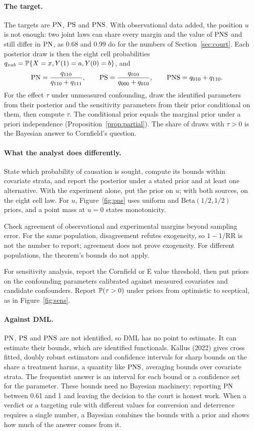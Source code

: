 \paragraph{The target.} The targets are $\mathrm{PN}$, $\mathrm{PS}$ and $\mathrm{PNS}$. With observational data added, the position $u$ is not enough: two joint laws can share every margin and the value of $\mathrm{PNS}$ and still differ in $\mathrm{PN}$, as 0.68 and 0.99 do for the numbers of Section~\ref{sec:court}. Each posterior draw is then the eight cell probabilities $q_{xab} = \mathbb{P}\{X = x, Y(1) = a, Y(0) = b\}$, and
\[
\mathrm{PN} = \frac{q_{110}}{q_{110} + q_{111}}, \qquad \mathrm{PS} = \frac{q_{010}}{q_{000} + q_{010}}, \qquad \mathrm{PNS} = q_{010} + q_{110}.
\]
For the effect $\tau$ under unmeasured confounding, draw the identified parameters from their posterior and the sensitivity parameters from their prior conditional on them, then compute $\tau$. The conditional prior equals the marginal prior under a priori independence (Proposition~\ref{prop:partial}). The share of draws with $\tau > 0$ is the Bayesian answer to Cornfield's question.

\paragraph{What the analyst does differently.} State which probability of causation is sought, compute its bounds within covariate strata, and report the posterior under a stated prior and at least one alternative. With the experiment alone, put the prior on $u$; with both sources, on the eight cell law. For $u$, Figure~\ref{fig:pns} uses uniform and $\mathrm{Beta}(1/2, 1/2)$ priors, and a point mass at $u = 0$ states monotonicity.

Check agreement of observational and experimental margins beyond sampling error. For the same population, disagreement refutes exogeneity, so $1 - 1/\mathrm{RR}$ is not the number to report; agreement does not prove exogeneity. For different populations, the theorem's bounds do not apply.

For sensitivity analysis, report the Cornfield or E value threshold, then put priors on the confounding parameters calibrated against measured covariates and candidate confounders. Report $\mathbb{P}(\tau > 0)$ under priors from optimistic to sceptical, as in Figure~\ref{fig:sens}.

\paragraph{Against DML.} $\mathrm{PN}$, $\mathrm{PS}$ and $\mathrm{PNS}$ are not identified, so DML has no point to estimate. It can estimate their bounds, which are identified functionals. Kallus (2022) gives cross fitted, doubly robust estimators and confidence intervals for sharp bounds on the share a treatment harms, a quantity like $\mathrm{PNS}$, averaging bounds over covariate strata. The frequentist answer is an interval for each bound or a confidence set for the parameter. These bounds need no Bayesian machinery: reporting $\mathrm{PN}$ between 0.61 and 1 and leaving the decision to the court is honest work. When a verdict or a targeting rule with different values for conversion and deterrence requires a single number, a Bayesian combines the bounds with a prior and shows how much of the answer comes from it.

